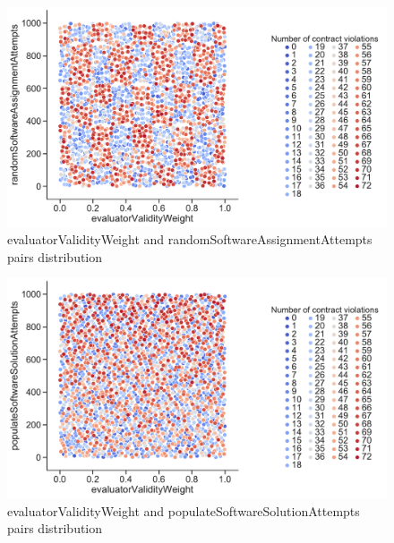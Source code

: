 \begin{figure}
	\centering
	\includegraphics[width=\textwidth]{images/PairsDistr/evaluatorValidityWeight_randomSoftwareAssignmentAttempts.pdf}
	\caption[evaluatorValidityWeight and randomSoftwareAssignmentAttempts pairs distribution]{evaluatorValidityWeight and randomSoftwareAssignmentAttempts pairs distribution}
	\label{fig:evaluatorValidityWeight_randomSoftwareAssignmentAttempts_pair}
\end{figure}
\clearpage
\begin{figure}
	\centering
	\includegraphics[width=\textwidth]{images/PairsDistr/evaluatorValidityWeight_populateSoftwareSolutionAttempts.pdf}
	\caption[evaluatorValidityWeight and populateSoftwareSolutionAttempts pairs distribution]{evaluatorValidityWeight and populateSoftwareSolutionAttempts pairs distribution}
	\label{fig:evaluatorValidityWeight_populateSoftwareSolutionAttempts_pair}
\end{figure}
\clearpage
